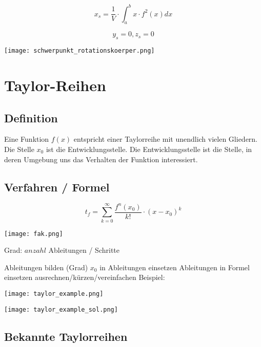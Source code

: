 \begin{multicols*}{3}
    \begin{multicols}{2}

        {$$x_s =\frac{1}{V}\cdot \int_{a}^{b}x \cdot f^2(x)dx$$}

        {$$y_s = 0 , z_s = 0$$}

        \columnbreak
        \texttt{[image: schwerpunkt\_rotationskoerper.png]}

    \end{multicols}

    \vfill\null
    \newpage
    \section{Taylor-Reihen}
    \subsection{Definition}
    {Eine Funktion $f(x)$ entspricht einer Taylorreihe mit unendlich vielen Gliedern. Die Stelle $x_0$ ist die Entwicklungsstelle. Die Entwicklungsstelle ist die Stelle, in deren Umgebung uns das Verhalten der Funktion interessiert.}
    \WhiteSpace
    \subsection{Verfahren / Formel}

    \begin{multicols*}{2}

        $$t_f = \sum_{k = 0}^{ \infty }\frac{f^n(x_0)}{k!}\cdot(x-x_0)^k$$

        \columnbreak
        \texttt{[image: fak.png]}

    \end{multicols*}
    {Grad: $anzahl$ Ableitungen / Schritte}

    { Ableitungen bilden (Grad)}
    \WhiteSpace
    { $x_0$ in Ableitungen einsetzen}
    \WhiteSpace
    { Ableitungen in Formel einsetzen}
    \WhiteSpace
    { ausrechnen/kürzen/vereinfachen}
    \WhiteSpace
    {Beispiel:}

    \texttt{[image: taylor\_example.png]}

    \texttt{[image: taylor\_example\_sol.png]}
    \vfill\null
    \columnbreak
    \subsection{Bekannte Taylorreihen}


\end{multicols*}
